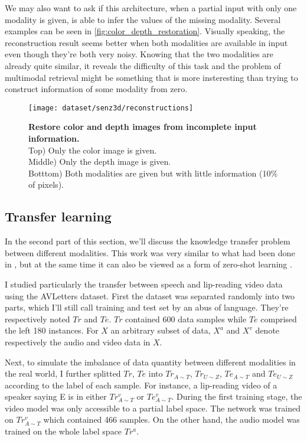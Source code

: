 We may also want to ask if this architecture, when a partial input with
only one modality is given, is able to infer the values of the missing
modality.
Several examples can be seen in \autoref{fig:color_depth_restoration}.
Visually speaking, the reconstruction result seems better when
both modalities are available in input even though they're both very noisy.
Knowing that the two modalities are already quite similar, it reveals
the difficulty of this task and the problem of multimodal retrieval
might be something that is more insteresting than trying to construct
information of some modality from zero.

\begin{figure}[H]
  \centering
  \texttt{[image: dataset/senz3d/reconstructions]}\\[-1em]
  \caption{%
    \textbf{Restore color and depth images from incomplete input
      information.}\\[0.1em]
    Top) Only the color image is given.\\[0.1em]
    Middle) Only the depth image is given.\\[0.1em]
    Botttom) Both modalities are given but with little information
      (10\% of pixels).}
  \label{fig:color_depth_restoration}
\end{figure}

\subsection{Transfer learning} \label{subsection:AVSR_transfer}

In the second part of this section, we'll discuss the knowledge transfer
problem between different modalities. This work was very similar to what
had been done in \cite{S. Moon 2015}, but at the same time it can also be
viewed as a form of zero-shot learning \cite{A. Frome 2013, R. Socher 2013}.

I studied particularly the transfer between speech and lip-reading
video data using the AVLetters dataset. First the dataset was separated
randomly into two parts, which I'll still call training and test set
by an abus of language. They're respectively noted $Tr$ and $Te$.
$Tr$ contained 600 data samples while $Te$ comprised the left 180 instances.
For $X$ an arbitrary subset of data, $X^a$ and $X^v$ denote respectively
the audio and video data in $X$.

Next, to simulate the imbalance of data quantity between different
modalities in the real world, I further splitted $Tr$, $Te$ into
$Tr_{A\sim T}$, $Tr_{U\sim Z}$, $Te_{A\sim T}$ and $Te_{U\sim Z}$
according to the label of each sample.
For instance, a lip-reading video of a speaker saying E is in either
$Tr_{A\sim T}^v$ or $Te_{A\sim T}^v$.
During the first training stage, the video model was only accessible
to a partial label space. The network was trained on $Tr_{A\sim T}^v$
which contained 466 samples. On the other hand, the audio model was trained
on the whole label space $Tr^a$.

